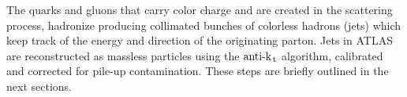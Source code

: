 The quarks and gluons that carry color charge and are created in the scattering
process, hadronize producing collimated bunches of colorless hadrons (jets)
which keep track of the energy and direction of the originating parton. Jets in
ATLAS are reconstructed as massless particles using the \emph{$\text{anti-k}_\mathrm{\, t}$}
algorithm, calibrated and corrected for pile-up contamination. These steps are
briefly outlined in the next sections.
